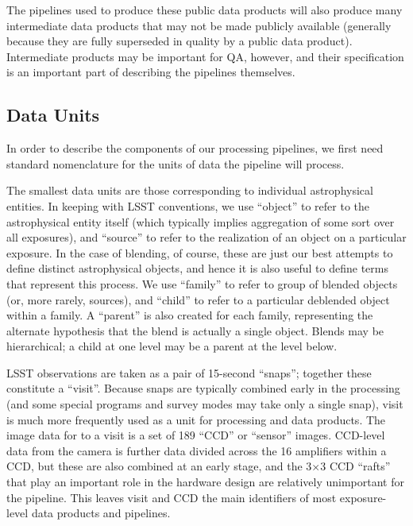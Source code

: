 The pipelines used to produce these public data products will also produce many intermediate data products that may not be made publicly available (generally because they are fully superseded in quality by a public data product).  Intermediate products may be important for QA, however, and their specification is an important part of describing the pipelines themselves.

\subsection{Data Units}
\label{sec:introDataUnits}

In order to describe the components of our processing pipelines, we first need standard nomenclature for the units of data the pipeline will process.

The smallest data units are those corresponding to individual astrophysical entities.  In keeping with LSST conventions, we use ``object'' to refer to the astrophysical entity itself (which typically implies aggregation of some sort over all exposures), and ``source'' to refer to the realization of an object on a particular exposure.  In the case of blending, of course, these are just our best attempts to define distinct astrophysical objects, and hence it is also useful to define terms that represent this process.  We use ``family'' to refer to group of blended objects (or, more rarely, sources), and ``child'' to refer to a particular deblended object within a family.  A ``parent'' is also created for each family, representing the alternate hypothesis that the blend is actually a single object.  Blends may be hierarchical; a child at one level may be a parent at the level below.

LSST observations are taken as a pair of 15-second ``snaps''; together these constitute a ``visit''.  Because snaps are typically combined early in the processing (and some special programs and survey modes may take only a single snap), visit is much more frequently used as a unit for processing and data products.  The image data for to a visit is a set of 189 ``CCD'' or ``sensor'' images.  CCD-level data from the camera is further data divided across the 16 amplifiers within a CCD, but these are also combined at an early stage, and the 3$\times$3 CCD ``rafts'' that play an important role in the hardware design are relatively unimportant for the pipeline.  This leaves visit and CCD the main identifiers of most exposure-level data products and pipelines.

